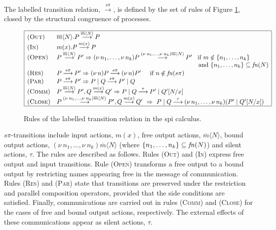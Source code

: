 \documentclass[10pt,a4paper,final,oneside,fleqn]{book}
\newcommand*{\todefout}{\mathbin{\mathop{\longrightarrow}\limits^{\overline{m}\langle N\rangle}}}
\newcommand*{\todefbout}{\mathbin{\mathop{\longrightarrow}\limits^{(\nu~\!n_1,\ldots,\nu~\!n_k)\overline{m}\langle N\rangle}}}
\newcommand*{\todefin}{\mathbin{\mathop{\longrightarrow}\limits^{m(x)}}}
\newcommand*{\todeftau}{\mathbin{\mathop{\longrightarrow}\limits^{\tau}}}
\newcommand*{\todefspi}{\mathbin{\mathop{\longrightarrow}\limits^{s\pi}}}
\begin{document}
The labelled transition relation, $\todefspi$, is defined by the set of rules of Figure \ref{sosspi}, closed by the structural congruence of processes.
\begin{figure}[bht]
\begin{center}
$\begin{array}{|ll|}\hline
(\textsc{Out})&\overline{m}\langle N\rangle.P\todefout P\\
(\textsc{In})&m(x).P\todefin P\\
(\textsc{Open})&P\todefout P'\Rightarrow (\nu~\!n_1,\ldots,\nu~\!n_k)P\todefbout P'\hspace{3mm}\mbox{if }m\notin\{n_1,\ldots,n_k\}\\
&\hspace{80mm}\mbox{and }\{n_1,\ldots,n_k\}\subseteq\mbox{{\itshape fn\/}}(N)\\
(\textsc{Res})&P\todefspi P'\Rightarrow (\nu~\!n)P\todefspi (\nu~\!n)P'\hspace{5mm}\mbox{if }n\notin\mbox{{\itshape fn\/}}(s\pi)\\
(\textsc{Par})&P\todefspi P'\Rightarrow P\mid Q\todefspi P'\mid Q\\
(\textsc{Comm})&P\todefout P',Q\todefin Q'\Rightarrow P\mid Q\todeftau P'\mid Q'[N/x]\\
(\textsc{Close})&P\todefbout P',Q\todefin Q'~\Rightarrow~P\mid Q\todeftau (\nu~\!n_1,\ldots,\nu~\!n_k)(P'\mid Q'[N/x])\\
\hline
\end{array}$
\end{center}
\caption{Rules of the labelled transition relation in the spi calculus.\label{sosspi}}
\end{figure}
$s\pi$-transitions include input actions, $m(x)$, free output actions, $\overline{m}\langle N\rangle$, bound output actions, $(\nu~\!n_1,\ldots,\nu~\!n_k)\overline{m}\langle N\rangle$ (where $\{n_1,\ldots,n_k\}\subseteq\mbox{{\itshape fn\/}}(N)$) and silent actions, $\tau$.  The rules are described as follows. Rules (\textsc{Out}) and (\textsc{In}) express free output and input transitions. Rule (\textsc{Open}) transforms a free output to a bound output by restricting names appearing free in the message of communication. Rules (\textsc{Res}) and (\textsc{Par}) state that transitions are preserved under the restriction and parallel composition operators, provided that the side conditions are satisfied. Finally, communications are carried out in rules (\textsc{Comm}) and (\textsc{Close}) for the cases of free and bound output actions, respectively.  The external effects of these communications appear as silent actions, $\tau$.
\end{document}
